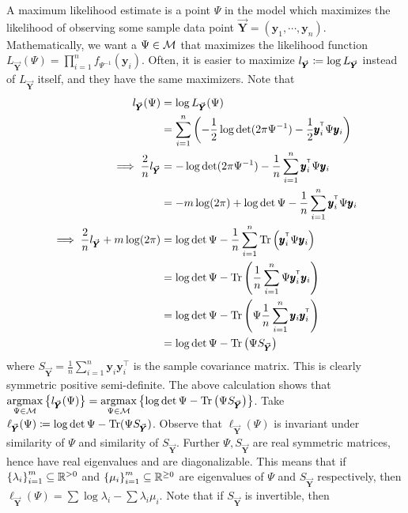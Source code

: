 A maximum likelihood estimate is a point $\Psi$ in the model which maximizes the likelihood of observing some sample data point $\vec {\pmb Y} = (\pmb y_1,\cdots, \pmb y_n)$. Mathematically, we want a $\Psi\in {\mathcal{M}}$ that maximizes the likelihood function $\displaystyle L_{\vec {\pmb Y}}(\Psi) = \prod_{i=1}^n f_{\Psi^{-1}}(\pmb y_i)$. Often, it is easier to maximize $l_{\vec {\pmb Y}} \coloneqq \log L_{\vec {\pmb Y}}$ instead of $L_{\vec {\pmb Y}}$ itself, and they have the same maximizers. Note that
\begin{align*}
l_{\vec {\pmb Y}}(\Psi) &= \log L_{\vec {\pmb Y}}(\Psi)\\
&= \sum_{i=1}^n \left(-\frac{1}{2}\log \det(2\pi \Psi^{-1}) - \frac{1}{2} \pmb y_i^\intercal \Psi \pmb y_i\right)\\
\implies \frac{2}{n}l_{\vec {\pmb Y}} &= -\log \det(2\pi \Psi^{-1}) - \frac{1}{n}\sum_{i=1}^n \pmb y_i^\intercal \Psi \pmb y_i\\
&= -m\log (2\pi) + \log \det \Psi - \frac{1}{n}\sum_{i=1}^n \pmb y_i^\intercal \Psi \pmb y_i\\
\implies \frac{2}{n}l_{\vec {\pmb Y}} + m\log(2\pi) &= \log \det \Psi -  \frac{1}{n}\sum_{i=1}^n \Tr\left(\pmb y_i^\intercal \Psi \pmb y_i\right)\\
&= \log \det \Psi -  \Tr\left(\frac{1}{n}\sum_{i=1}^n \Psi\pmb y_i^\intercal \pmb y_i\right)\\
&= \log \det \Psi -  \Tr\left(\Psi \frac{1}{n}\sum_{i=1}^n \pmb y_i\pmb y_i^\intercal\right)\\
&= \log \det \Psi -  \Tr\left(\Psi S_{\vec{\pmb Y}}\right)
\end{align*}
where $\displaystyle S_{\vec{\pmb Y}} = \frac{1}{n}\sum_{i=1}^n \pmb y_i \pmb y_i^\intercal$ is the sample covariance matrix. This is clearly symmetric positive semi-definite. The above calculation shows that $\displaystyle \underset{\Psi\in{\mathcal{M}}}{\operatorname{argmax}}\left\{l_{\vec{\pmb Y}} (\Psi)\right\} = \underset{\Psi\in{\mathcal{M}}}{\operatorname{argmax}}\left\{\log \det \Psi -  \operatorname{Tr}\left(\Psi S_{\vec{\pmb Y}}\right)\right\}$. Take $\ell_{\vec{\pmb Y}}(\Psi)\coloneqq \log\det\Psi - \operatorname{Tr}(\Psi S_{\vec{\pmb Y}})$. Observe that $\ell_{\vec{\pmb Y}}(\Psi)$ is invariant under similarity of $\Psi$ and similarity of $S_{\vec{\pmb Y}}$. Further $\Psi,S_{\vec{\pmb Y}}$ are real symmetric matrices, hence have real eigenvalues and are diagonalizable. This means that if $\left\{\lambda_i\right\}_{i=1}^m \subseteq \mathbb{R}^{>0}$ and $\left\{\mu_i\right\}_{i=1}^m\subseteq \mathbb{R}^{\geq 0}$ are eigenvalues of $\Psi$ and $S_{\vec{\pmb Y}}$ respectively, then $\ell_{\vec{\pmb Y}}(\Psi) = \sum\log \lambda_i - \sum \lambda_i\mu_i$. Note that if $S_{\vec{\pmb Y}}$ is invertible, then 

